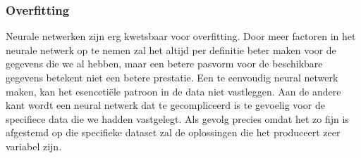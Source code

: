 \subsubsection{Overfitting}
Neurale netwerken zijn erg kwetsbaar voor overfitting. Door meer factoren in het neurale netwerk op te nemen zal het altijd per definitie beter maken voor de gegevens die we al hebben, maar een betere pasvorm voor de beschikbare gegevens betekent niet een betere prestatie. Een te eenvoudig neural netwerk maken, kan het esencetiële patroon in de data niet vastleggen. Aan de andere kant wordt een neural netwerk dat te gecompliceerd is te gevoelig voor de specifiece data die we hadden vastgelegt. Als gevolg precies omdat het zo fijn is afgestemd op die specifieke dataset zal de oplossingen die het produceert zeer variabel zijn\cite{algoritms}.\\\\
